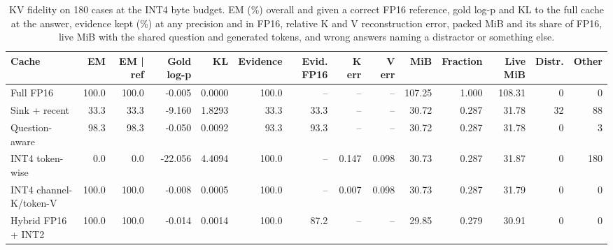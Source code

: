 \begin{table}[!htb]
\centering
\scriptsize
\setlength{\tabcolsep}{3.5pt}
\caption{KV fidelity on 180 cases at the INT4 byte budget. EM (\%) overall and given a correct FP16 reference, gold log-p and KL to the full cache at the answer, evidence kept (\%) at any precision and in FP16, relative K and V reconstruction error, packed MiB and its share of FP16, live MiB with the shared question and generated tokens, and wrong answers naming a distractor or something else.}
\label{tab:t2cfid}
\begin{adjustbox}{max width=\linewidth}
\begin{tabular}{lrrrrrrrrrrrrr}
\toprule
Cache & EM & EM | ref & Gold log-p & KL & Evidence & Evid. FP16 & K err & V err & MiB & Fraction & Live MiB & Distr. & Other \\
\midrule
Full FP16 & 100.0 & 100.0 & -0.005 & 0.0000 & 100.0 & -- & -- & -- & 107.25 & 1.000 & 108.31 & 0 & 0 \\
Sink + recent & 33.3 & 33.3 & -9.160 & 1.8293 & 33.3 & 33.3 & -- & -- & 30.72 & 0.287 & 31.78 & 32 & 88 \\
Question-aware & 98.3 & 98.3 & -0.050 & 0.0092 & 93.3 & 93.3 & -- & -- & 30.72 & 0.287 & 31.78 & 0 & 3 \\
INT4 token-wise & 0.0 & 0.0 & -22.056 & 4.4094 & 100.0 & -- & 0.147 & 0.098 & 30.73 & 0.287 & 31.87 & 0 & 180 \\
INT4 channel-K/token-V & 100.0 & 100.0 & -0.008 & 0.0005 & 100.0 & -- & 0.007 & 0.098 & 30.73 & 0.287 & 31.79 & 0 & 0 \\
Hybrid FP16 + INT2 & 100.0 & 100.0 & -0.014 & 0.0014 & 100.0 & 87.2 & -- & -- & 29.85 & 0.279 & 30.91 & 0 & 0 \\
\bottomrule
\end{tabular}
\end{adjustbox}
\end{table}
